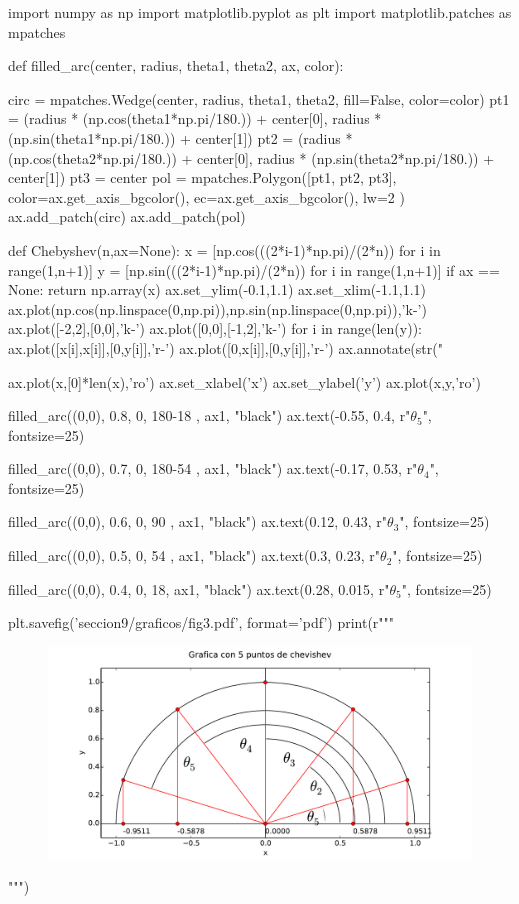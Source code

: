 \begin{python}
import numpy as np
import matplotlib.pyplot as plt
import matplotlib.patches as mpatches

def filled_arc(center, radius, theta1, theta2, ax, color):

    circ = mpatches.Wedge(center, radius, theta1, theta2, fill=False, color=color)
    pt1 = (radius * (np.cos(theta1*np.pi/180.)) + center[0],
           radius * (np.sin(theta1*np.pi/180.)) + center[1])
    pt2 = (radius * (np.cos(theta2*np.pi/180.)) + center[0],
           radius * (np.sin(theta2*np.pi/180.)) + center[1])
    pt3 = center
    pol = mpatches.Polygon([pt1, pt2, pt3], color=ax.get_axis_bgcolor(),
                           ec=ax.get_axis_bgcolor(), lw=2 )
    ax.add_patch(circ)
    ax.add_patch(pol)

def Chebyshev(n,ax=None):
    x = [np.cos(((2*i-1)*np.pi)/(2*n)) for i in range(1,n+1)]
    y = [np.sin(((2*i-1)*np.pi)/(2*n)) for i in range(1,n+1)]
    if ax == None:
        return np.array(x)
    ax.set_ylim(-0.1,1.1)
    ax.set_xlim(-1.1,1.1)
    ax.plot(np.cos(np.linspace(0,np.pi)),np.sin(np.linspace(0,np.pi)),'k-')
    ax.plot([-2,2],[0,0],'k-')
    ax.plot([0,0],[-1,2],'k-')
    for i in range(len(y)):
        ax.plot([x[i],x[i]],[0,y[i]],'r-')
        ax.plot([0,x[i]],[0,y[i]],'r-')
        ax.annotate(str("%
            
    ax.plot(x,[0]*len(x),'ro')
    ax.set_xlabel('x')
    ax.set_ylabel('y')
    ax.plot(x,y,'ro')
    
    filled_arc((0,0), 0.8, 0, 180-18 , ax1, "black")
    ax.text(-0.55, 0.4, r"$\theta_5$", fontsize=25)

    filled_arc((0,0), 0.7, 0, 180-54 , ax1, "black")
    ax.text(-0.17, 0.53, r"$\theta_4$", fontsize=25)

    filled_arc((0,0), 0.6, 0, 90 , ax1, "black")
    ax.text(0.12, 0.43, r"$\theta_3$", fontsize=25)

    filled_arc((0,0), 0.5, 0, 54 , ax1, "black")
    ax.text(0.3, 0.23, r"$\theta_2$", fontsize=25)

    filled_arc((0,0), 0.4, 0, 18, ax1, "black")
    ax.text(0.28, 0.015, r"$\theta_5$", fontsize=25)

    plt.savefig('seccion9/graficos/fig3.pdf', format='pdf')
    print(r"""
    \begin{figure}[htbp]
       \centering
        \includegraphics[width=18cm]{seccion9/graficos/fig3.pdf}
        \label{fig:comparison}
    \end{figure}
    """)
   


\end{python}
